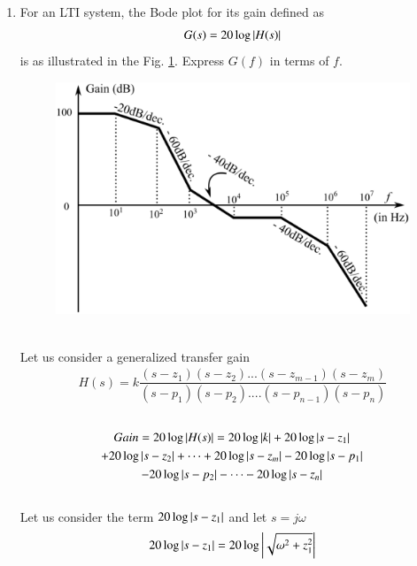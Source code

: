\begin{enumerate}[label=\thesection.\arabic*.,ref=\thesection.\theenumi]

\item For an LTI system, the Bode plot for its gain defined as
\begin{align}
	G(s) = 20\log\left\vert H(s)\right\vert
	\label{eq:ee18btech11001_gain}
\end{align}
is as illustrated in the Fig. \ref{fig:ee18btech11001_bode}. Express $G(f)$ in terms of $f$.\\
\begin{figure}[ht!]
    \includegraphics[width=\columnwidth]{./figs/ee18btech11001.eps}
    \caption{}
    \label{fig:ee18btech11001_bode}
\end{figure}\\

\solution
Let us consider a generalized transfer gain\\
\begin{align}
	H(s) = k \dfrac{(s-z_{1})(s-z_{2})...(s-z_{m-1})(s-z_{m})}{(s-p_{1})(s-p_{2})....(s-p_{n-1})(s-p_{n})}
\end{align}\\
\begin{multline}
	Gain = 20\log\left\vert H(s)\right\vert = 20\log \left\vert k\right\vert + 20\log \left\vert s-z_{1}\right\vert 
	    \\
	    + 20\log \left\vert s-z_{2}\right\vert + \dots + 20\log \left\vert s-z_{m}\right\vert - 20\log \left\vert s-p_{1}\right\vert 
	    \\
	    - 20\log \left\vert s-p_{2}\right\vert - \dots - 20\log \left\vert s-z_{n}\right\vert 
\end{multline}\\

Let us consider the term $ 20\log \left\vert s-z_{1}\right\vert $ and let $s = j\omega$\\
\begin{align}
	20\log \left\vert s-z_{1}\right\vert = 20\log \left\vert\sqrt{\omega^{2} + z_{1}^{2}}\right\vert
\end{align}\\


\end{enumerate}
